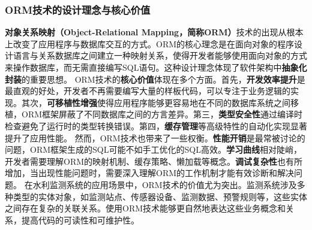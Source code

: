 \subsubsection{ORM技术的设计理念与核心价值}\label{ormux6280ux672fux7684ux8bbeux8ba1ux7406ux5ff5ux4e0eux6838ux5fc3ux4ef7ux503c}
\textbf{对象关系映射（Object-Relational
Mapping，简称ORM）}技术的出现从根本上改变了应用程序与数据库交互的方式。ORM的核心理念是在面向对象的程序设计语言与关系数据库之间建立一种映射关系，使得开发者能够使用面向对象的方式来操作数据库，而无需直接编写SQL语句。这种设计理念体现了软件架构中\textbf{抽象化封装}的重要思想。
ORM技术的\textbf{核心价值}体现在多个方面。首先，\textbf{开发效率提升}是最直观的好处，开发者不再需要编写大量的样板代码，可以专注于业务逻辑的实现。其次，\textbf{可移植性增强}使得应用程序能够更容易地在不同的数据库系统之间移植，ORM框架屏蔽了不同数据库之间的方言差异。第三，\textbf{类型安全性}通过编译时检查避免了运行时的类型转换错误。第四，\textbf{缓存管理}等高级特性的自动化实现显著提升了应用性能。
然而，ORM技术也带来了一些权衡。\textbf{性能开销}是最常被讨论的问题，ORM框架生成的SQL可能不如手工优化的SQL高效。\textbf{学习曲线}相对陡峭，开发者需要理解ORM的映射机制、缓存策略、懒加载等概念。\textbf{调试复杂性}也有所增加，当出现性能问题时，需要深入理解ORM的工作机制才能有效诊断和解决问题。
在水利监测系统的应用场景中，ORM技术的价值尤为突出。监测系统涉及多种类型的实体对象，如监测站点、传感器设备、监测数据、预警规则等，这些实体之间存在复杂的关联关系。使用ORM技术能够更自然地表达这些业务概念和关系，提高代码的可读性和可维护性。
